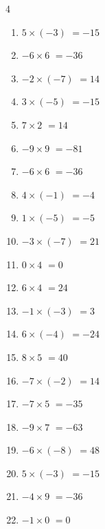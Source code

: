 \begin{multicols}{4}
\begin{enumerate}
  \item $5\times (-3)$
        $=-15$

  \item $-6\times 6$
        $=-36$

  \item $-2\times (-7)$
        $=14$

\columnbreak %

  \item $3\times (-5)$
        $=-15$

  \item $7\times 2$
        $=14$

  \item $-9\times 9$
        $=-81$

  \item $-6\times 6$
        $=-36$

  \item $4\times (-1)$
        $=-4$

  \item $1\times (-5)$
        $=-5$

  \item $-3\times (-7)$
        $=21$

  \item $0\times 4$
        $=0$

  \item $6\times 4$
        $=24$

  \item $-1\times (-3)$
        $=3$

  \item $6\times (-4)$
        $=-24$

  \item $8\times 5$
        $=40$

  \item $-7\times (-2)$
        $=14$

  \item $-7\times 5$
        $=-35$

  \item $-9\times 7$
        $=-63$

  \item $-6\times (-8)$
        $=48$

  \item $5\times (-3)$
        $=-15$

  \item $-4\times 9$
        $=-36$

  \item $-1\times 0$
        $=0$


\end{enumerate}
\end{multicols}
